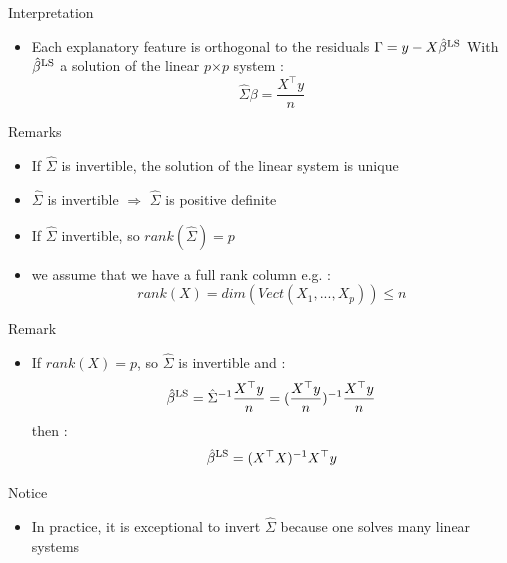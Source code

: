 \documentclass[unknownkeysallowed]{beamer}
\begin{document}
\begin{frame}

\begin{alertblock}{Interpretation}
    \begin{itemize}
        \item  Each explanatory feature is orthogonal to the residuals $\Gamma=y-X\hat{\beta}^{\rm LS}$ With $\hat{\beta}^{\rm LS}$ a solution of the linear $p$$\times$$p$ system : $$ \hat{\Sigma}\beta= \frac{X^{\top} y}{n}  $$

    \end{itemize}


\end{alertblock}

\begin{block}{Remarks}
    \begin{itemize}
        \item  If $\hat{\Sigma}$ is invertible, the solution of the linear system is unique
        \item $\hat{\Sigma}$ is invertible $\Rightarrow$ $\hat{\Sigma}$ is positive definite
        \item If $\hat{\Sigma}$ invertible, so $rank(\hat{\Sigma})=p$
        \item we assume that we have a full rank column e.g. : $$rank(X)=dim(Vect(X_1,...,X_p)) \leq n $$

    \end{itemize}


\end{block}
\end{frame}



\begin{frame}



\begin{alertblock}{Remark}
    \begin{itemize}
        \item  If $rank(X)=p$, so $\hat{\Sigma}$ is invertible and : $$\hat{\beta}^{\rm LS}=\hat{\Sigma}^{-1}\frac{X^{\top} y}{n}=(\frac{X^{\top} y}{n})^{-1} \frac{X^{\top} y}{n}$$
       then :  $$ \hat{\beta}^{\rm LS}=(X^{\top}X)^{-1}X^{\top}y$$

    \end{itemize}


\end{alertblock}

\begin{block}{Notice}
    \begin{itemize}
        \item  In practice, it is exceptional to invert $\hat{\Sigma} $ because one solves many linear systems
       
    \end{itemize}


\end{block}
\end{frame}
\end{document}
